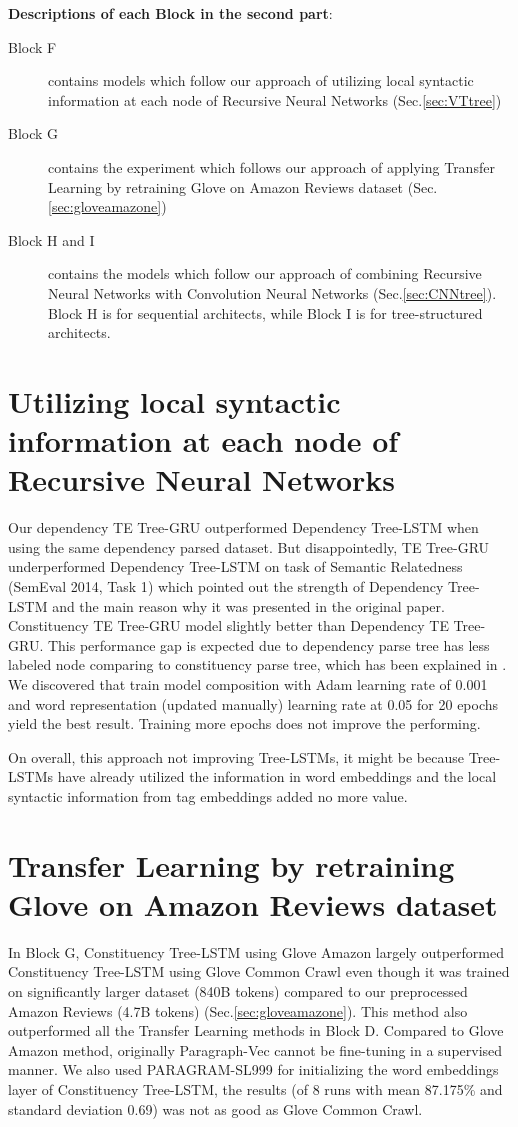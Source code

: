 \textbf{Descriptions of each Block in the second part}:
\begin{description}
\item[Block F] contains models which follow our approach of utilizing local syntactic information at each node of Recursive Neural Networks (Sec.\ref{sec:VTtree})
\item[Block G] contains the experiment which follows our approach of applying Transfer Learning by retraining Glove on Amazon Reviews dataset (Sec.\ref{sec:gloveamazone})
\item[Block H and I] contains the models which follow our approach of combining Recursive Neural Networks with Convolution Neural Networks (Sec.\ref{sec:CNNtree}).
Block H is for sequential architects, while Block I is for tree-structured architects.
\end{description} 

\section{Utilizing local syntactic information at each node of Recursive Neural Networks}
Our dependency TE Tree-GRU outperformed Dependency Tree-LSTM when using the same dependency parsed dataset. 
But disappointedly, TE Tree-GRU underperformed Dependency Tree-LSTM on task of Semantic Relatedness (SemEval 2014, Task 1\cite{SemeEvalTask1}) which pointed out the strength of Dependency Tree-LSTM and the main reason why it was presented in the original paper\cite{treeLSTM}.
Constituency TE Tree-GRU model slightly better than Dependency TE Tree-GRU. 
This performance gap is expected due to dependency parse tree has less labeled node comparing to constituency parse tree, which has been explained in  \cite{treeLSTM}. 
We discovered that train model composition with Adam learning rate of 0.001 and word representation (updated manually) learning rate at 0.05 for 20 epochs yield the best result. 
Training more epochs does not improve the performing.

On overall, this approach not improving Tree-LSTMs, it might be because Tree-LSTMs have already utilized the information in word embeddings and the local syntactic information from tag embeddings added no more value.

\section{Transfer Learning by retraining Glove on Amazon Reviews dataset}
In Block G, Constituency Tree-LSTM using Glove Amazon largely outperformed Constituency Tree-LSTM using Glove Common Crawl even though it was trained on significantly larger dataset (840B tokens) compared to our preprocessed Amazon Reviews (4.7B tokens) (Sec.\ref{sec:gloveamazone}).
This method also outperformed all the Transfer Learning methods in Block D.
Compared to Glove Amazon method, originally Paragraph-Vec\cite{ParagraphVec} cannot be fine-tuning in a supervised manner.
We also used PARAGRAM-SL999 for initializing the word embeddings layer of Constituency Tree-LSTM,
the results (of 8 runs with mean 87.175\% and standard deviation 0.69) was not as good as Glove Common Crawl. 

